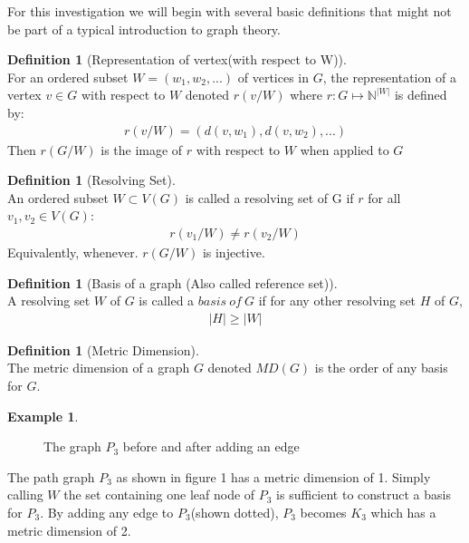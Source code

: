 \documentclass[11pt]{amsart}
\theoremstyle{plain}  %
\theoremstyle{definition}
\newtheorem{defin}[thm]{{Definition}}
\newtheorem{ex}[thm]{Example}
\theoremstyle{remark}
\numberwithin{equation}{thm}
\begin{document}
    For this investigation we will begin with several basic definitions that might not be part of a typical introduction to graph theory.

 \begin{defin}[Representation of vertex(with respect to W)]\ \\
    For an ordered subset $W=(w_1, w_2, ...)$ of vertices in $G$, the representation of a vertex $v \in G$ with respect to $W$ denoted $r(v/W)$ where $r:G\mapsto \mathbb{N}^{|W|}$ is defined by:
  \begin{align*}
  r(v/W)=(d(v,w_1), d(v,w_2), ...)
  \end{align*}
  Then $r(G/W)$ is the image of $r$ with respect to $W$ when applied to $G$
 \end{defin}
    
 \begin{defin}[Resolving Set]\ \\
  An ordered subset $W \subset V(G)$ is called a resolving set of G if $r$ for all $v_1, v_2 \in V(G)$: 
  \begin{align*}
  r(v_1/W) \neq  r(v_2/W)
  \end{align*}
  Equivalently, whenever. $r(G/W)$ is injective.
 \end{defin}
 
 \begin{defin}[Basis of a graph (Also called reference set)]\ \\
  A resolving set $W$ of $G$ is called a $basis\ of\ G$ if for any other resolving set $H$ of $G$, 
  \begin{align*}
   |H| \geq |W|
  \end{align*}

 \end{defin}
 
 \begin{defin}[Metric Dimension]\ \\
  The metric dimension of a graph $G$ denoted $MD(G)$ is the order of any basis for $G$.
 \end{defin}

\begin{ex}

\begin{figure}
\caption{The graph $P_3$ before and after adding an edge}
\end{figure}
The path graph $P_3$ as shown in figure 1 has a metric dimension of 1. Simply calling $W$ the set containing one leaf node of $P_3$ is sufficient to construct a basis for $P_3$.
By adding any edge to $P_3$(shown dotted), $P_3$ becomes $K_3$ which has a metric dimension of 2.
\end{ex}
\end{document}

